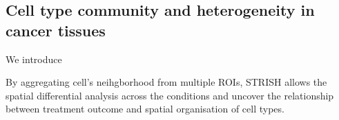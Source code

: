 \subsection{Cell type community and heterogeneity in cancer tissues}
We introduce 

By aggregating cell's neihgborhood from multiple ROIs, STRISH allows the spatial differential analysis across the  conditions and uncover the relationship between treatment outcome and spatial organisation of cell types.





